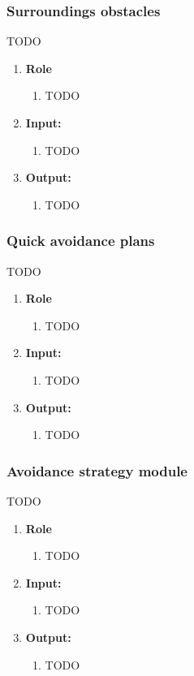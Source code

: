 \subsubsection{Surroundings obstacles}
TODO
\begin{enumerate}[]
	\item \textbf{Role}
	    \begin{enumerate}[]
		    \item TODO
		\end{enumerate}
	\item \textbf{Input:}
	    \begin{enumerate}[1.]
		\item TODO
		\end{enumerate}	
	\item \textbf{Output:}
	    \begin{enumerate}[1.]
		\item TODO
		\end{enumerate}
\end{enumerate}

\subsubsection{Quick avoidance plans}
TODO
\begin{enumerate}[]
	\item \textbf{Role}
	    \begin{enumerate}[]
		    \item TODO
		\end{enumerate}
	\item \textbf{Input:}
	    \begin{enumerate}[1.]
		\item TODO
		\end{enumerate}	
	\item \textbf{Output:}
	    \begin{enumerate}[1.]
		\item TODO
		\end{enumerate}
\end{enumerate}

\subsubsection{Avoidance strategy module}
TODO
\begin{enumerate}[]
	\item \textbf{Role}
	    \begin{enumerate}[]
		    \item TODO
		\end{enumerate}
	\item \textbf{Input:}
	    \begin{enumerate}[1.]
		\item TODO
		\end{enumerate}	
	\item \textbf{Output:}
	    \begin{enumerate}[1.]
		\item TODO
		\end{enumerate}
\end{enumerate}


